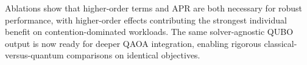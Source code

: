 \documentclass{article}
\begin{document}
Ablations show that higher-order terms and APR are both necessary for robust performance, with higher-order effects contributing the strongest individual benefit on contention-dominated workloads. The same solver-agnostic QUBO output is now ready for deeper QAOA integration, enabling rigorous classical-versus-quantum comparisons on identical objectives.
\end{document}
